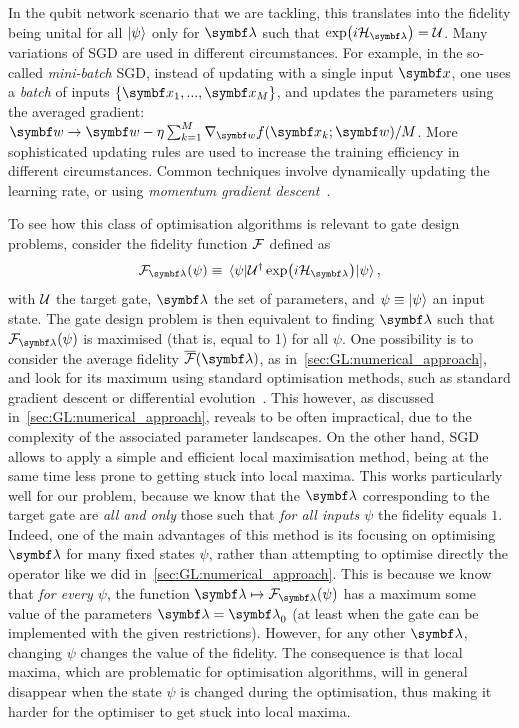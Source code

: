 In the qubit network scenario that we are tackling, this translates into the fidelity being unital for all $\ket\psi$ only for $\bslambda$ such that $\exp(i\calH_\bslambda)=\calU$.
Many variations of \ac{SGD} are used in different circumstances.
For example, in the so-called \emph{mini-batch} \ac{SGD}, instead of updating with a single input $\bs x$, one uses a \emph{batch} of inputs $\{\bs x_1,...,\bs x_M\}$, and updates the parameters using the averaged gradient:
$\bs w\to\bs w-\eta\sum_{k=1}^M\grad_{\bs w}f(\bs x_k; \bs w)/M$.
More sophisticated updating rules are used to increase the training efficiency in different circumstances.
Common techniques involve dynamically updating the learning rate, or using \emph{momentum gradient descent}~\cite{goh2017momentum,ruder2016overview}.

To see how this class of optimisation algorithms is relevant to gate design problems, consider the fidelity function ${\mathcal{F}}$ defined as
\begin{equation}
	\calF_\bslambda(\psi) \equiv \mel{\psi}{\calU^\dagger \exp(i \calH_\bslambda)}{\psi},
	\label{eq:GL:def_fidelity}
\end{equation}
with ${\mathcal{U}}$ the target gate, $\bslambda$ the set of parameters, and $\psi\equiv\ket\psi$ an input state.
The gate design problem is then equivalent to finding $\bslambda$ such that $\calF_\bslambda(\psi)$ is maximised (that is, equal to 1) for all $\psi$.
One possibility is to consider the average fidelity $\barcalF(\bslambda)$, as in~\cref{sec:GL:numerical_approach}, and look for its maximum using standard optimisation methods, such as standard gradient descent or differential evolution~\cite{chakraborty2008advances}.
This however, as discussed in~\cref{sec:GL:numerical_approach}, reveals to be often impractical, due to the complexity of the associated parameter landscapes.
On the other hand, \ac{SGD} allows to apply a simple and efficient local maximisation method, being at the same time less prone to getting stuck into local maxima.
This works particularly well for our problem, because we know that the $\bslambda$ corresponding to the target gate are \emph{all and only} those such that \emph{for all inputs $\psi$} the fidelity equals $1$.
Indeed, one of the main advantages of this method is its focusing on optimising $\bslambda$ for many fixed states $\psi$, rather than attempting to optimise directly the operator like we did in~\cref{sec:GL:numerical_approach}.
This is because we know that \emph{for every $\psi$}, the function $\bslambda\mapsto \calF_\bslambda(\psi)$ has a maximum some value of the parameters $\bslambda=\bslambda_0$ (at least when the gate can be implemented with the given restrictions). However, for any other $\bslambda$, changing $\psi$ changes the value of the fidelity. The consequence is that local maxima, which are problematic for optimisation algorithms, will in general disappear when the state $\psi$ is changed during the optimisation, thus making it harder for the optimiser to get stuck into local maxima.


